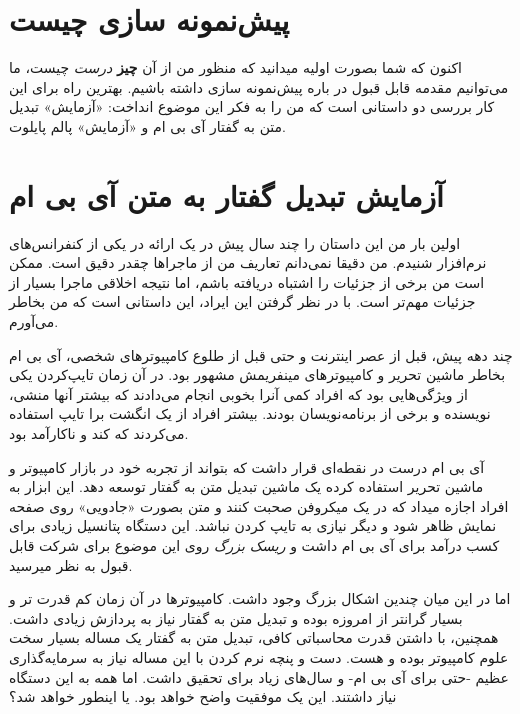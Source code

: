 \section{پیش‌نمونه سازی
چیست}\label{ux67eux6ccux634ux646ux645ux648ux646ux647-ux633ux627ux632ux6cc-ux686ux6ccux633ux62a}

اکنون که شما بصورت اولیه میدانید که منظور من از آن \textbf{چیز}
\emph{درست} چیست، ما می‌توانیم مقدمه قابل قبول در باره پیش‌نمونه سازی
داشته باشیم. بهترین راه برای این کار بررسی دو داستانی است که من را به
فکر این موضوع انداخت: «آزمایش» تبدیل متن به گفتار آی بی ام و «آزمایش»
پالم پایلوت.

\section{آزمایش تبدیل گفتار به متن آی بی
ام}\label{ux622ux632ux645ux627ux6ccux634-ux62aux628ux62fux6ccux644-ux6afux641ux62aux627ux631-ux628ux647-ux645ux62aux646-ux622ux6cc-ux628ux6cc-ux627ux645}

اولین بار من این داستان را چند سال پیش در یک ارائه در یکی از کنفرانس‌های
نرم‌افزار شنیدم. من دقیقا نمی‌دانم تعاریف من از ماجراها چقدر دقیق است.
ممکن است من برخی از جزئیات را اشتباه دریافته باشم، اما نتیجه اخلاقی
ماجرا بسیار از جزئیات مهم‌تر است. با در نظر گرفتن این ایراد، این داستانی
است که من بخاطر می‌آورم.

چند دهه پیش، قبل از عصر اینترنت و حتی قبل از طلوع کامپیوترهای شخصی، آی
بی ام بخاطر ماشین تحریر و کامپیوترهای مینفریمش مشهور بود. در آن زمان
تایپ‌کردن یکی از ویژگی‌هایی بود که افراد کمی آنرا بخوبی انجام می‌دادند
که بیشتر آنها منشی، نویسنده و برخی از برنامه‌نویسان بودند. بیشتر افراد
از یک انگشت برا تایپ استفاده می‌کردند که کند و ناکارآمد بود.

آی بی ام درست در نقطه‌ای قرار داشت که بتواند از تجربه خود در بازار
کامپیوتر و ماشین تحریر استفاده کرده یک ماشین تبدیل متن به گفتار توسعه
دهد. این ابزار به افراد اجازه میداد که در یک میکروفن صحبت کنند و متن
بصورت «جادویی» روی صفحه نمایش ظاهر شود و دیگر نیازی به تایپ کردن نباشد.
این دستگاه پتانسیل زیادی برای کسب درآمد برای آی بی ام داشت و \emph{ریسک
بزرگ} روی این موضوع برای شرکت قابل قبول به نظر میرسید.

اما در این میان چندین اشکال بزرگ وجود داشت. کامپیوترها در آن زمان کم
قدرت تر و بسیار گرانتر از امروزه بوده و تبدیل متن به گفتار نیاز به
پردازش زیادی داشت. همچنین، با داشتن قدرت محاسباتی کافی، تبدیل متن به
گفتار یک مساله بسیار سخت علوم کامپیوتر بوده و هست. دست و پنچه نرم کردن
با این مساله نیاز به سرمایه‌گذاری عظیم -حتی برای آی بی ام- و سال‌های
زیاد برای تحقیق داشت. اما همه به این دستگاه نیاز داشتند. این یک موفقیت
واضح خواهد بود. یا اینطور خواهد شد؟

